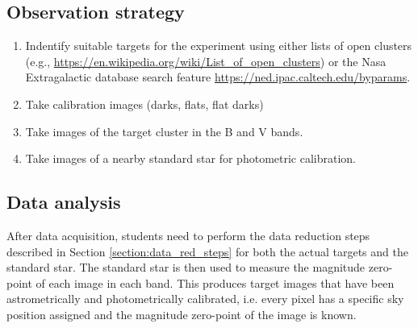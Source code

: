 \documentclass[a4paper, 11pt, fleqn]{memoir}
\begin{document}
\subsection{Observation strategy}
\begin{enumerate}
    \item Indentify suitable targets for the experiment using either lists of open clusters (e.g., \url{https://en.wikipedia.org/wiki/List_of_open_clusters}) or the Nasa Extragalactic database search feature \url{https://ned.ipac.caltech.edu/byparams}.
    \item Take calibration images (darks, flats, flat darks)
    \item Take images of the target cluster in the B and V bands.
    \item Take images of a nearby standard star for photometric calibration.
\end{enumerate}

\subsection{Data analysis}

After data acquisition, students need to perform the data reduction steps described in Section \ref{section:data_red_steps} for both the actual targets and the standard star.
The standard star is then used to measure the magnitude zero-point of each image in each band.
This produces target images that have been astrometrically and photometrically calibrated, i.e. every pixel has a specific sky position assigned and the magnitude zero-point of the image is known.
\end{document}
